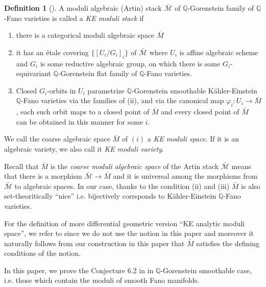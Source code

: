 \documentclass[12pt]{amsart}
\theoremstyle{remark}
\theoremstyle{definition}
\newtheorem{Def}[Thm]{Definition}
\begin{document}
\begin{Def}[{\cite[Definition 3.13]{OSS}}]\label{KE.stack}
A moduli algebraic (Artin) stack $\bar{\mathcal{M}}$ of $\mathbb{Q}$-Gorenstein 
family of 
$\mathbb{Q}$-Fano varieties is called a \textit{KE moduli stack} if 
\begin{enumerate}
\item there is a categorical moduli algebraic space $\bar{M}$ 
\item it has an \'etale covering $\{ [U_i/G_i] _{i}\}$ of $\bar{\mathcal{M}}$ 
where $U_i$ is affine algebraic scheme 
and $G_{i}$ is some reductive algebraic group, on which there is 
some $G_i$-equivariant 
$\mathbb{Q}$-Gorenstein flat family of $\mathbb{Q}$-Fano varieties. 
\item Closed $G_{i}$-orbits in $U_i$ 
parametrize $\mathbb{Q}$-Gorenstein smoothable K\"ahler-Einstein $
\mathbb{Q}$-Fano varieties via the families of (ii), and via the 
canonical map $\varphi_{i}\colon U_{i}\to \bar{M}$, each such orbit 
maps to a closed point of $\bar{M}$ and every closed point of $\bar{M}$ 
can be obtained in this manner for some $i$. 
\end{enumerate}
We call the coarse algebraic space $\bar{M}$ of $(i)$ a \emph{KE moduli space}. 
If it is an algebraic variety, we also call it \emph{KE moduli variety}. 

\end{Def}

Recall that $\bar{M}$ is the \textit{coarse moduli algebraic space} of 
the Artin stack $\bar{\mathcal{M}}$ means that 
there is a morphism $\bar{\mathcal{M}}\rightarrow \bar{M}$ and 
it is universal among the morphisms from $\bar{\mathcal{M}}$ to algebraic spaces. 
In our case, thanks to the condition (ii) and (iii) $\bar{M}$ is also 
set-theoritically ``nice'' i.e. bijectively corrsponds to 
K\"ahler-Einstein $\mathbb{Q}$-Fano varieties. 

For the definition of more differential geometric version ``KE analytic moduli space'', we refer to \cite[Definition 3.14, 3.15]{OSS} since we do not use the notion in this paper and moreover 
it naturally follows from our construction in this paper that $\bar{M}$ satisfies the defining  
conditions of the notion. 

In this paper, we prove the Conjecture 6.2 in \cite{OSS} in $\mathbb{Q}$-Gorenstein smoothable case, 
i.e. those which contain the moduli of smooth Fano manifolds. 
\end{document}

